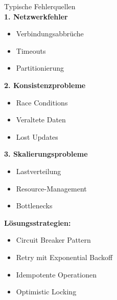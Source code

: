 \begin{KR}{Typische Fehlerquellen}\\
\textbf{1. Netzwerkfehler}
\begin{itemize}
    \item Verbindungsabbrüche
    \item Timeouts
    \item Partitionierung
\end{itemize}

\textbf{2. Konsistenzprobleme}
\begin{itemize}
    \item Race Conditions
    \item Veraltete Daten
    \item Lost Updates
\end{itemize}

\textbf{3. Skalierungsprobleme}
\begin{itemize}
    \item Lastverteilung
    \item Resource-Management
    \item Bottlenecks
\end{itemize}

\textbf{Lösungsstrategien:}
\begin{itemize}
    \item Circuit Breaker Pattern
    \item Retry mit Exponential Backoff
    \item Idempotente Operationen
    \item Optimistic Locking
\end{itemize}
\end{KR}

